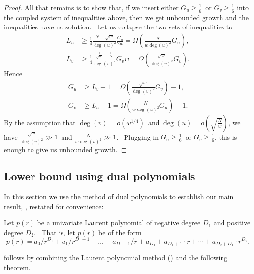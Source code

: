 \documentclass[10pt,a4paper]{article}
\newcommand{\<}{\langle}
\renewcommand{\>}{\rangle}
\begin{document}
\begin{proof}
All that remains is to show that, if we insert either $G_{u}\geq\frac{1}{6}
$\ or $G_{v}\geq\frac{1}{6}$ into the coupled system of inequalities above,
then we get unbounded growth and the inequalities have no solution. \ Let us
collapse the two sets of inequalities to
\begin{align*}
L_{u}  &  \geq\frac{1}{4}\frac{N-\sqrt{w}}{\deg\left(  u\right)  ^{2}}
\frac{G_{u}}{2w}=\Omega\left(  \frac{N}{w\deg\left(  u\right)  ^{2}}
G_{u}\right)  ,\\
L_{v}  &  \geq\frac{1}{4}\frac{\frac{1}{\sqrt{w}}-\frac{1}{N}}{\deg\left(
v\right)  ^{2}}G_{v}w=\Omega\left(  \frac{\sqrt{w}}{\deg\left(  v\right)
^{2}}G_{v}\right)  .
\end{align*}
Hence
\begin{align*}
G_{u}  &  \geq L_{v}-1=\Omega\left(  \frac{\sqrt{w}}{\deg\left(  v\right)
^{2}}G_{v}\right)  -1,\\
G_{v}  &  \geq L_{u}-1=\Omega\left(  \frac{N}{w\deg\left(  u\right)  ^{2}
}G_{u}\right)  -1.
\end{align*}
By the assumption that $\deg\left(  v\right)  =o\left(  w^{1/4}\right)  $\ and
$\deg\left(  u\right)  =o\left(  \sqrt{\frac{N}{w}}\right)  $, we have
$\frac{\sqrt{w}}{\deg\left(  v\right)  ^{2}}\gg1$\ and $\frac{N}{w\deg\left(
u\right)  ^{2}}\gg1$. \ Plugging in $G_{u}\geq\frac{1}{6}$\ or $G_{v}\geq
\frac{1}{6}$, this is enough to give us unbounded growth.
\end{proof}

%
\subsection{Lower bound using dual polynomials}
\label{s:dualpoly}\label{sec:dualpoly}

In this section we use the method of dual polynomials to
establish our main result, , restated for convenience:

\main*

Let $p(r)$ be a univariate Laurent polynomial of negative degree $D_{1}$ and
positive degree $D_{2}$. \ That is, let $p(r)$ be of the form
\begin{equation}
p(r)=a_{0}/r^{D_{1}}+a_{1}/r^{D_{1}-1}+\dots
+a_{D_{1}-1}/r+a_{D_{1}}+a_{D_{1}+1}\cdot r+\cdots +a_{D_{2}+D_{1}}\cdot
r^{D_{2}}.
\end{equation}

 follows by combining the Laurent polynomial method () and the following
theorem.
\end{document}
